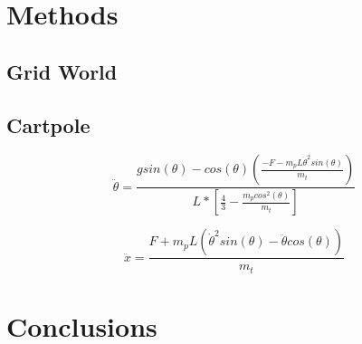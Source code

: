 \documentclass{jfm}
\begin{document}
\section{Methods}
\subsection{Grid World}
\subsection{Cartpole}
\cite{Florian2007}

\cite{1606.01540}

\begin{equation}
\ddot{\theta} = \frac{g sin(\theta) - cos(\theta) \left(\frac{-F - m_{p} L \dot{\theta}^2 sin(\theta)}{m_{t}}\right)}{L * \left[\frac{4}{3} - \frac{m_{p} cos^2(\theta)}{m_{t}}\right]}
\end{equation}

\begin{equation}
\ddot{x} = \frac{F + m_{p}L\left(\dot{\theta}^2 sin(\theta) - \ddot{\theta} cos(\theta) \right)}{m_{t}}
\end{equation}


\section{Conclusions}




\end{document}
